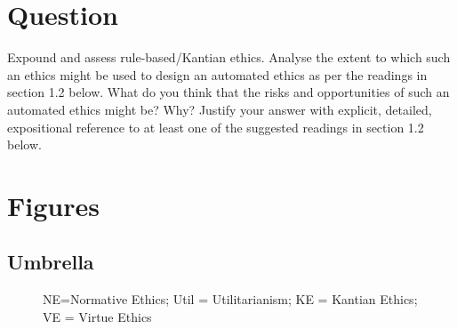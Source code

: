\documentclass{scrartcl}
\begin{document}


\tableofcontents

\newpage
\section{Question}
\begin{tcolorbox}[colback=white,colframe=purple,sharp corners]
Expound and assess rule-based/Kantian ethics. Analyse the extent to
which such an ethics might be used to design an automated ethics as per
the readings in section 1.2 below. What do you think that the risks and
opportunities of such an automated ethics might be? Why? Justify your
answer with explicit, detailed, expositional reference to at least one of the
suggested readings in section 1.2 below.
\end{tcolorbox}

\section{Figures}

\subsection{Umbrella}
\begin{figure}[ht]
  \centering
{}
\caption{\scriptsize NE=Normative Ethics; Util = Utilitarianism; KE = Kantian Ethics; VE = Virtue Ethics}
\label{fig:umbrella}
\end{figure}
\end{document}
